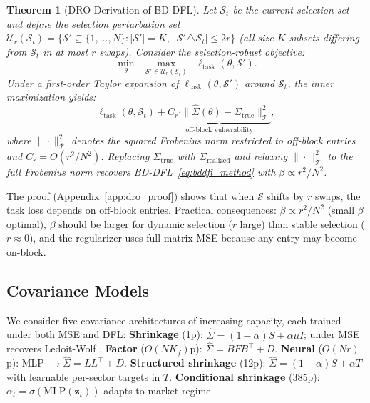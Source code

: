 \documentclass[letterpaper]{article}
\newtheorem{theorem}{Theorem}
\newcommand{\bSigma}{\hat{\Sigma}}
\newcommand{\cS}{\mathcal{S}}
\begin{document}
\begin{theorem}[DRO Derivation of BD-DFL]
\label{thm:dro}
Let $\cS_t$ be the current selection set and define the selection perturbation set $\mathcal{U}_r(\cS_t) = \{\cS' \subseteq \{1,\ldots,N\} : |\cS'| = K,\; |\cS' \triangle \cS_t| \leq 2r\}$ (all size-$K$ subsets differing from $\cS_t$ in at most $r$ swaps). Consider the selection-robust objective:
\begin{equation}
\min_\theta \;\; \max_{\cS' \in \mathcal{U}_r(\cS_t)} \;\; \ell_{\mathrm{task}}(\theta, \cS').
\label{eq:dro}
\end{equation}
Under a first-order Taylor expansion of $\ell_{\mathrm{task}}(\theta, \cS')$ around $\cS_t$, the inner maximization yields:
\begin{equation}
\ell_{\mathrm{task}}(\theta, \cS_t) + \underbrace{C_r \cdot \|\hat\Sigma(\theta) - \Sigma_{\mathrm{true}}\|_{\bar{\mathcal{T}}}^2}_{\text{off-block vulnerability}},
\label{eq:dro_expansion}
\end{equation}
where $\|\cdot\|_{\bar{\mathcal{T}}}^2$ denotes the squared Frobenius norm restricted to off-block entries and $C_r = O(r^2 / N^2)$. Replacing $\Sigma_{\mathrm{true}}$ with $\Sigma_{\mathrm{realized}}$ and relaxing $\|\cdot\|_{\bar{\mathcal{T}}}^2$ to the full Frobenius norm recovers BD-DFL~\eqref{eq:bddfl_method} with $\beta \propto r^2/N^2$.
\end{theorem}

The proof (Appendix~\ref{app:dro_proof}) shows that when $\cS$ shifts by $r$ swaps, the task loss depends on off-block entries. Practical consequences: $\beta \propto r^2/N^2$ (small $\beta$ optimal), $\beta$ should be larger for dynamic selection ($r$ large) than stable selection ($r \approx 0$), and the regularizer uses full-matrix MSE because any entry may become on-block.

\subsection{Covariance Models}

We consider five covariance architectures of increasing capacity, each trained under both MSE and DFL:
\textbf{Shrinkage} (1p): $\bSigma = (1{-}\alpha)S + \alpha \mu I$; under MSE recovers Ledoit-Wolf \citep{ledoit2004well}.
\textbf{Factor} ($O(NK_f)$p): $\bSigma = BFB^\top + D$.
\textbf{Neural} ($O(Nr)$p): MLP $\to \bSigma = LL^\top + D$.
\textbf{Structured shrinkage} (12p): $\bSigma = (1{-}\alpha)S + \alpha T$ with learnable per-sector targets in $T$.
\textbf{Conditional shrinkage} (385p): $\alpha_t = \sigma(\text{MLP}(\mathbf{z}_t))$ adapts to market regime.
\end{document}
